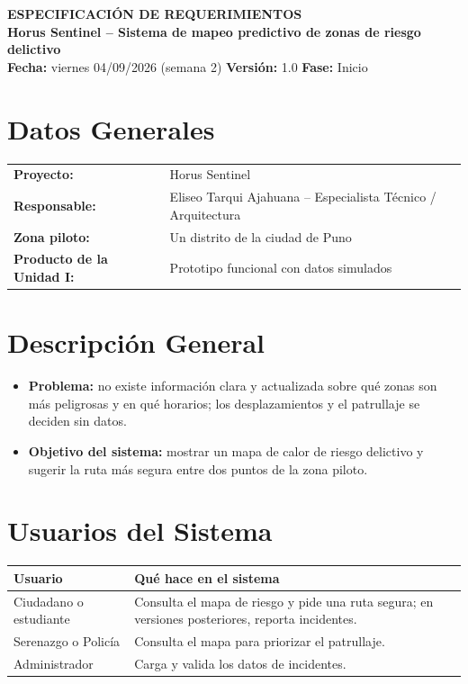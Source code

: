 \documentclass[11pt,a4paper]{article}
\begin{document}
\begin{center}
    {\Large \textbf{\textcolor{AzulUNA}{ESPECIFICACIÓN DE REQUERIMIENTOS}}}\\[3pt]
    {\normalsize \textbf{Horus Sentinel -- Sistema de mapeo predictivo de zonas de riesgo delictivo}}\\[4pt]
    \footnotesize \textbf{Fecha:} viernes 04/09/2026 (semana 2) \quad \textbar\quad \textbf{Versión:} 1.0 \quad \textbar\quad \textbf{Fase:} Inicio
\end{center}

\vspace{0.1cm}

\section{Datos Generales}
\noindent\begin{tabularx}{\textwidth}{@{}P{4.2cm} L@{}}
\toprule
\textbf{Proyecto:} & Horus Sentinel \\
\textbf{Responsable:} & Eliseo Tarqui Ajahuana -- Especialista Técnico / Arquitectura \\
\textbf{Zona piloto:} & Un distrito de la ciudad de Puno \\
\textbf{Producto de la Unidad I:} & Prototipo funcional con datos simulados \\
\bottomrule
\end{tabularx}

\section{Descripción General}
\begin{itemize}[leftmargin=*]
    \item \textbf{Problema:} no existe información clara y actualizada sobre qué zonas son más peligrosas y en qué horarios; los desplazamientos y el patrullaje se deciden sin datos.
    \item \textbf{Objetivo del sistema:} mostrar un mapa de calor de riesgo delictivo y sugerir la ruta más segura entre dos puntos de la zona piloto.
\end{itemize}

\section{Usuarios del Sistema}
{\small
\noindent\begin{tabularx}{\textwidth}{@{}P{3.4cm} L@{}}
\toprule
{}
\textbf{Usuario} & \textbf{Qué hace en el sistema} \\
\midrule
Ciudadano o estudiante & Consulta el mapa de riesgo y pide una ruta segura; en versiones posteriores, reporta incidentes. \\
Serenazgo o Policía & Consulta el mapa para priorizar el patrullaje. \\
Administrador & Carga y valida los datos de incidentes. \\
\bottomrule
\end{tabularx}
}
\end{document}

